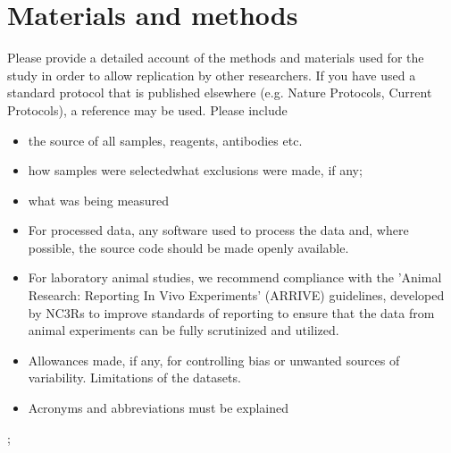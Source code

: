 \section{Materials and methods} 
Please provide a detailed account of the methods and materials used for the study in order to allow replication by other researchers.
If you have used a standard protocol that is published elsewhere (e.g. Nature Protocols, Current Protocols), a reference may be used. Please include \begin{itemize}
\item 
the source of all samples, reagents, antibodies etc.
\item 
 how samples were selectedwhat exclusions were made, if any;
\item 
what was being measured
\item 
For processed data, any software used to process the data and, where possible, the source code should be made openly available.\item 

For laboratory animal studies, we recommend compliance with the 'Animal Research: Reporting In Vivo Experiments' (ARRIVE) guidelines, developed by NC3Rs to improve standards of reporting to ensure that the data from animal experiments can be fully scrutinized and utilized.\item 

Allowances made, if any, for controlling bias or unwanted sources of variability.
Limitations of the datasets.\item 

Acronyms and abbreviations must be explained
\end{itemize}; 